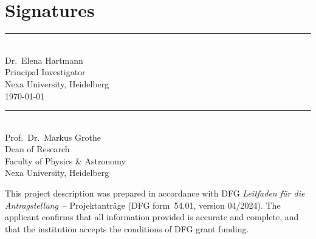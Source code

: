 \section*{Signatures}
\label{sec:sig}

\vspace{8mm}

\noindent
\begin{minipage}[t]{0.45\linewidth}
\rule{0.9\linewidth}{0.5pt}\\[2pt]
{\small Dr.\ Elena Hartmann\\
Principal Investigator\\
Nexa University, Heidelberg\\
\today}
\end{minipage}%
\hfill
\begin{minipage}[t]{0.45\linewidth}
\rule{0.9\linewidth}{0.5pt}\\[2pt]
{\small Prof.\ Dr.\ Markus Grothe\\
Dean of Research\\
Faculty of Physics \& Astronomy\\
Nexa University, Heidelberg}
\end{minipage}

\vspace{16mm}

\noindent
\begin{tcolorbox}[
  enhanced, sharp corners,
  colback=dfglightgray, colframe=dfgmidgray,
  top=2mm, bottom=2mm, left=4mm, right=4mm,
  fontupper=\small\color{dfgdarkgray}
]
\faInfoCircle\quad This project description was prepared in accordance with DFG
\textit{Leitfaden f\"ur die Antragstellung}~-- Projektantr\"age (DFG form~54.01, version
04/2024). The applicant confirms that all information provided is accurate and complete,
and that the institution accepts the conditions of DFG grant funding.
\end{tcolorbox}
